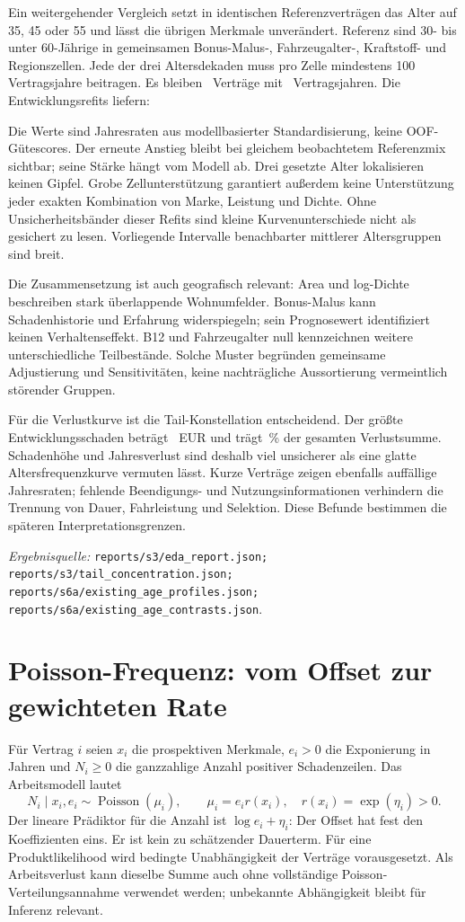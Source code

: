 \documentclass[11pt,a4paper]{article}
\newcommand{\evidence}[1]{\par{\footnotesize\textit{Ergebnisquelle:} \nolinkurl{#1}.}\par}
\begin{document}
Ein weitergehender Vergleich setzt in identischen Referenzverträgen das Alter auf 35, 45 oder 55 und lässt die übrigen Merkmale unverändert. Referenz sind 30- bis unter 60-Jährige in gemeinsamen Bonus-Malus-, Fahrzeugalter-, Kraftstoff- und Regionszellen. Jede der drei Altersdekaden muss pro Zelle mindestens 100 Vertragsjahre beitragen. Es bleiben \AgePolicies\ Verträge mit \AgeExposure\ Vertragsjahren. Die Entwicklungsrefits liefern:
\begin{center}\AgeTable\end{center}
Die Werte sind Jahresraten aus modellbasierter Standardisierung, keine OOF-Gütescores. Der erneute Anstieg bleibt bei gleichem beobachtetem Referenzmix sichtbar; seine Stärke hängt vom Modell ab. Drei gesetzte Alter lokalisieren keinen Gipfel. Grobe Zellunterstützung garantiert außerdem keine Unterstützung jeder exakten Kombination von Marke, Leistung und Dichte. Ohne Unsicherheitsbänder dieser Refits sind kleine Kurvenunterschiede nicht als gesichert zu lesen. Vorliegende Intervalle benachbarter mittlerer Altersgruppen sind breit.

Die Zusammensetzung ist auch geografisch relevant: Area und log-Dichte beschreiben stark überlappende Wohnumfelder. Bonus-Malus kann Schadenhistorie und Erfahrung widerspiegeln; sein Prognosewert identifiziert keinen Verhaltenseffekt. B12 und Fahrzeugalter null kennzeichnen weitere unterschiedliche Teilbestände. Solche Muster begründen gemeinsame Adjustierung und Sensitivitäten, keine nachträgliche Aussortierung vermeintlich störender Gruppen.

Für die Verlustkurve ist die Tail-Konstellation entscheidend. Der größte Entwicklungsschaden beträgt \LargestClaim\ EUR und trägt \LargestShare\,\% der gesamten Verlustsumme. Schadenhöhe und Jahresverlust sind deshalb viel unsicherer als eine glatte Altersfrequenzkurve vermuten lässt. Kurze Verträge zeigen ebenfalls auffällige Jahresraten; fehlende Beendigungs- und Nutzungsinformationen verhindern die Trennung von Dauer, Fahrleistung und Selektion. Diese Befunde bestimmen die späteren Interpretationsgrenzen.
\evidence{reports/s3/eda_report.json; reports/s3/tail_concentration.json; reports/s6a/existing_age_profiles.json; reports/s6a/existing_age_contrasts.json}

\clearpage
\section{Poisson-Frequenz: vom Offset zur gewichteten Rate}
Für Vertrag $i$ seien $x_i$ die prospektiven Merkmale, $e_i>0$ die Exponierung in Jahren und $N_i\geq0$ die ganzzahlige Anzahl positiver Schadenzeilen. Das Arbeitsmodell lautet
\begin{equation}
 N_i\mid x_i,e_i\sim\operatorname{Poisson}(\mu_i),\qquad
 \mu_i=e_i r(x_i),\quad r(x_i)=\exp(\eta_i)>0.
\end{equation}
Der lineare Prädiktor für die Anzahl ist $\log e_i+\eta_i$: Der Offset hat fest den Koeffizienten eins. Er ist kein zu schätzender Dauerterm. Für eine Produktlikelihood wird bedingte Unabhängigkeit der Verträge vorausgesetzt. Als Arbeitsverlust kann dieselbe Summe auch ohne vollständige Poisson-Verteilungsannahme verwendet werden; unbekannte Abhängigkeit bleibt für Inferenz relevant.
\end{document}
